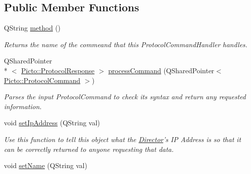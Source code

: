 \subsection*{Public Member Functions}
\begin{DoxyCompactItemize}
\item 
\hypertarget{struct_f_p_g_e_t_command_handler_a768884adb2818c0a3bc92c96f24b8fd6}{Q\-String \hyperlink{struct_f_p_g_e_t_command_handler_a768884adb2818c0a3bc92c96f24b8fd6}{method} ()}\label{struct_f_p_g_e_t_command_handler_a768884adb2818c0a3bc92c96f24b8fd6}

\begin{DoxyCompactList}\small\item\em Returns the name of the commeand that this Protocol\-Command\-Handler handles. \end{DoxyCompactList}\item 
Q\-Shared\-Pointer\\*
$<$ \hyperlink{struct_picto_1_1_protocol_response}{Picto\-::\-Protocol\-Response} $>$ \hyperlink{struct_f_p_g_e_t_command_handler_af72ebd8c0c825168faa7faf0c23249b5}{process\-Command} (Q\-Shared\-Pointer$<$ \hyperlink{struct_picto_1_1_protocol_command}{Picto\-::\-Protocol\-Command} $>$)
\begin{DoxyCompactList}\small\item\em Parses the input Protocol\-Command to check its syntax and return any requested information. \end{DoxyCompactList}\item 
\hypertarget{struct_f_p_g_e_t_command_handler_a4a95d31b5d87c78f147dac71fba64c34}{void \hyperlink{struct_f_p_g_e_t_command_handler_a4a95d31b5d87c78f147dac71fba64c34}{set\-Ip\-Address} (Q\-String val)}\label{struct_f_p_g_e_t_command_handler_a4a95d31b5d87c78f147dac71fba64c34}

\begin{DoxyCompactList}\small\item\em Use this function to tell this object what the \hyperlink{class_director}{Director}'s I\-P Address is so that it can be correctly returned to anyone requesting that data. \end{DoxyCompactList}\item 
\hypertarget{struct_f_p_g_e_t_command_handler_a1185b2bf9d4d7a1f80418144b49f4550}{void \hyperlink{struct_f_p_g_e_t_command_handler_a1185b2bf9d4d7a1f80418144b49f4550}{set\-Name} (Q\-String val)}\label{struct_f_p_g_e_t_command_handler_a1185b2bf9d4d7a1f80418144b49f4550}


\end{DoxyCompactItemize}
